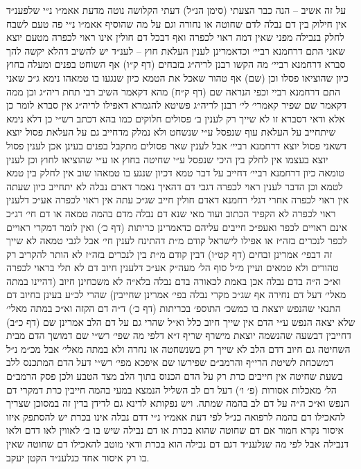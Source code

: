\documentclass[12pt, openany]{book}
\begin{document}
\begin{multicols}{2}
על זה אשיב – הנה כבר הצעתי (סימן הנ״ל) דעתי הקלושה נוטה מדעת אאמ״ו נ״י שלפענ״ד אין חילוק בין דם נבלה לדם שחוטה או נחורה וגם על מה שהוסיף אאמ״ו נ״י פה טעם לשבח לחלק בנבילה מפני שאין דמה ראוי לכפרה ואף דבכל דם חולין אינו ראוי לכפרה מטעם יוצא שאני התם דרחמנא רביי׳ וכדאמרינן לענין העלאת חוץ – לענ״ד יש להשיב דהלא יקשה להך סברא דרחמנא רביי׳ מה הקשו רבנן לריה״ג בזבחים (דף ק״ו) אף השוחט בפנים ומעלה בחוץ כיון שהוציאו פסלו וכן (שם) אף טהור שאכל את הטמא כיון שנגעו בו טמאהו נימא ג״כ שאני התם דרחמנא רביי וכפי הנראה שם (דף ק״ח) מהא דקאמר השיב רבי תחת ריה״ג וכן ממה דקאמר שם שפיר קאמרי׳ לי׳ רבנן לריה״ג פשיטא להגמרא דאפילו לריה״ג אין סברא לומר כן אלא ודאי דסברא זו לא שייך רק לענין ב׳ פסולים חלוקים כמו בהא דכתב רש״י כן דלא נימא שיתחייב על העלאת עוף שנפסל ע״י שנשחט ולא נמלק מדחייב גם על העלאת פסול יוצא דשאני פסול יוצא דרחמנא רביי׳ אבל לענין שאר פסולים מתקבל בפנים בעינן אכן לענין פסול יוצא בעצמו אין לחלק בין היכי שנפסל ע״י שחיטה בחוץ או ע״י שהוציאו לחוץ וכן לענין טומאה כיון דרחמנא רביי׳ דחייב על דבר טמא דכיון שנגע בו טמאהו שוב אין לחלק בין טמא לטמא וכן הדבר לענין ראוי לכפרה דגבי דם דהאיך נאמר דאדם נבלה לא יתחייב כיון שעתה אין ראוי לכפרה אחרי דגלי רחמנא דאדם חולין חייב שג״כ עתה אין ראוי לכפרה אע״כ דלענין ראוי לכפרה לא הקפיד הכתוב ועוד מאי שנא דם נבלה מדם בהמה טמאה או דם חי׳ דג״כ אינם ראויים לכפר ואעפ״כ חייבים עליהם כדאמרינן כריתות (דף כ׳) ואין לומר דמקרי ראויים לכפר לנכרים בזה״ז או אפילו לישראל קודם מ״ת דהתינח לענין חי׳ אבל לגבי טמאה לא שייך זה דבפי׳ אמרינן זבחים (דף קט״ו) דבין קודם מ״ת בין לנכרים בזה״ז לא הותר להקריב רק טהורים ולא טמאים ועיין מ״ל סוף הל׳ מעה״ק אע״כ דלענין חיוב דם לא תלי בראוי לכפרה וא״כ ה״ה בדם נבלה אכן באמת לכאורה בדם נבלה בלא״ה לא משכחינן חיוב (דהיינו במתה מאלי׳ דעל דם נחירה אף שג״כ מקרי נבלה בפי׳ אמרינן שחייבין) שהרי לכ״ע בעינן בחיוב דם התנאי שהנפש יוצאת בו כמשכ׳ התוספ׳ בכריתות (דף כ׳) ד״ה דם הקזה וא״כ במתה מאלי׳ שלא יצאה הנפש ע״י הדם אין שייך חיוב כלל וא״ל שהרי גם על דם הלב אמרינן שם (דף כ״ב) דחייבין דבשעה שהנשמה יוצאת מישרף שריף ז״א דלפי מה שפי׳ רש״י שם דמושך הדם מבית השחיטה גם חיוב דדם הלב לא שייך רק בשנשחטה או נחרה ולא במתה מאלי׳ אבל מכ״מ נ״ל דמשכחת לשיטת הרי״ף והרמב״ם שפירשו שם איפכא מפי׳ רש״י דעל הדם המתכנס ללב בשעת שחיטה אין חייבים כרת רק על הדם הכנוס בתוך הלב מצד הטבע ולכן פסק הרמב״ם הל׳ מאכלות אסורות (פ׳ ו׳) דעל דם לב השליל הנמצא במעי בהמה חייבין כרת דמקרי דם הנפש וא״כ ה״ה על דם לב בהמה שמתה. ויש נפקותא לדינא גם לדידן בדין זה במסוכן שצריך להאכילו דם בהמה לרפואה כנ״ל לפי דעת אאמ״ו נ״י דדם נבלה אינו בכרת יש להסתפק איזו איסור נקרא חמור אם דם שחוטה שהוא בכרת או דם נבילה שיש בו ב׳ לאווין לאו דדם ולאו דנבילה אבל לפי מה שנלענ״ד דגם דם נבילה הוא בכרת ודאי מוטב להאכילו דם שחוטה שאין בו רק איסור אחד כנלענ״ד הקטן יעקב.\\\vspace{0pt}

\end{multicols}\newpage
\end{document}
